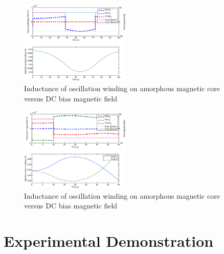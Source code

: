 \documentclass[letterpaper, 10 pt, conference]{ieeeconf}  %
\begin{document}
  \begin{figure}[thpb]
      \centering

      \includegraphics[width = 0.47\textwidth]{figures/curve_translations.eps}
      \caption{Inductance of oscillation winding on amorphous
       magnetic core versus DC bias magnetic field}
      \label{figurelabel}
   \end{figure}

   \begin{figure}[thpb]
      \centering

      \includegraphics[width = 0.47\textwidth]{figures/curve_rotations.eps}
      \caption{Inductance of oscillation winding on amorphous
       magnetic core versus DC bias magnetic field}
      \label{figurelabel}
   \end{figure}


\section{Experimental Demonstration}\label{sec:experiments}
\end{document}
